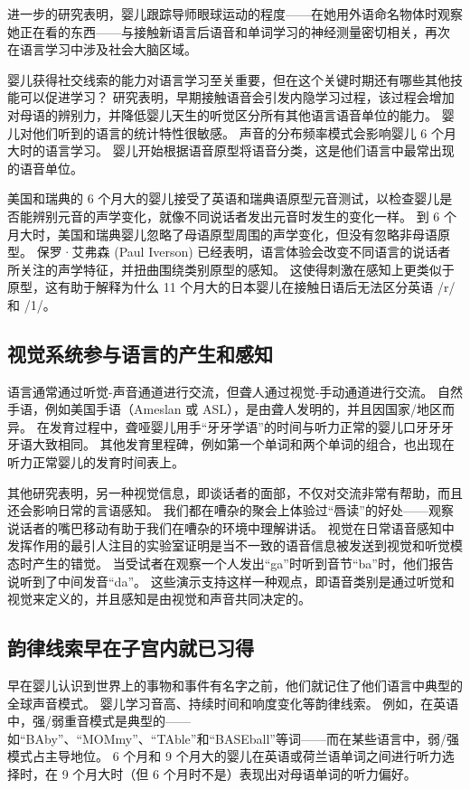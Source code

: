 进一步的研究表明，婴儿跟踪导师眼球运动的程度——在她用外语命名物体时观察她正在看的东西——与接触新语言后语音和单词学习的神经测量密切相关，再次 在语言学习中涉及社会大脑区域。

婴儿获得社交线索的能力对语言学习至关重要，但在这个关键时期还有哪些其他技能可以促进学习？ 研究表明，早期接触语音会引发内隐学习过程，该过程会增加对母语的辨别力，并降低婴儿天生的听觉区分所有其他语言语音单位的能力。 婴儿对他们听到的语言的统计特性很敏感。 声音的分布频率模式会影响婴儿 6 个月大时的语言学习。 婴儿开始根据语音原型将语音分类，这是他们语言中最常出现的语音单位。

美国和瑞典的 6 个月大的婴儿接受了英语和瑞典语原型元音测试，以检查婴儿是否能辨别元音的声学变化，就像不同说话者发出元音时发生的变化一样。 到 6 个月大时，美国和瑞典婴儿忽略了母语原型周围的声学变化，但没有忽略非母语原型。 保罗·艾弗森 (Paul Iverson) 已经表明，语言体验会改变不同语言的说话者所关注的声学特征，并扭曲围绕类别原型的感知。 这使得刺激在感知上更类似于原型，这有助于解释为什么 11 个月大的日本婴儿在接触日语后无法区分英语 /r/ 和 /1/。

\subsection{视觉系统参与语言的产生和感知}
语言通常通过听觉-声音通道进行交流，但聋人通过视觉-手动通道进行交流。 自然手语，例如美国手语（Ameslan 或 ASL），是由聋人发明的，并且因国家/地区而异。 在发育过程中，聋哑婴儿用手“牙牙学语”的时间与听力正常的婴儿口牙牙牙牙语大致相同。 其他发育里程碑，例如第一个单词和两个单词的组合，也出现在听力正常婴儿的发育时间表上。

其他研究表明，另一种视觉信息，即谈话者的面部，不仅对交流非常有帮助，而且还会影响日常的言语感知。 我们都在嘈杂的聚会上体验过“唇读”的好处——观察说话者的嘴巴移动有助于我们在嘈杂的环境中理解讲话。 视觉在日常语音感知中发挥作用的最引人注目的实验室证明是当不一致的语音信息被发送到视觉和听觉模态时产生的错觉。 当受试者在观察一个人发出“ga”时听到音节“ba”时，他们报告说听到了中间发音“da”。 这些演示支持这样一种观点，即语音类别是通过听觉和视觉来定义的，并且感知是由视觉和声音共同决定的。

\subsection{韵律线索早在子宫内就已习得}
早在婴儿认识到世界上的事物和事件有名字之前，他们就记住了他们语言中典型的全球声音模式。 婴儿学习音高、持续时间和响度变化等韵律线索。 例如，在英语中，强/弱重音模式是典型的——如“BAby”、“MOMmy”、“TAble”和“BASEball”等词——而在某些语言中，弱/强模式占主导地位。 6 个月和 9 个月大的婴儿在英语或荷兰语单词之间进行听力选择时，在 9 个月大时（但 6 个月时不是）表现出对母语单词的听力偏好。

